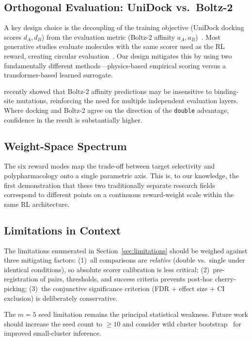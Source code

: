 
\subsection{Orthogonal Evaluation: UniDock vs.\ Boltz-2}

A key design choice is the decoupling of the training objective (UniDock
docking scores $d_A, d_B$) from the evaluation metric (Boltz-2 affinity
$a_A, a_B$)~\citep{passaro2025boltz2}.  Most generative studies evaluate
molecules with the same scorer used as the RL reward, creating circular
evaluation~\citep{abdelsayed2025polypharmacology}.
Our design mitigates this by using two fundamentally different
methods---physics-based empirical scoring versus a transformer-based
learned surrogate.


\citet{bret2026boltz2docking} recently showed that Boltz-2 affinity
predictions may be insensitive to binding-site mutations, reinforcing the
need for multiple independent evaluation layers.  Where docking and Boltz-2
agree on the direction of the \texttt{double} advantage, confidence in the
result is substantially higher.

\subsection{Weight-Space Spectrum}

The six reward modes map the trade-off between target selectivity and
polypharmacology onto a single parametric axis.  This is, to our knowledge,
the first demonstration that these two traditionally separate research
fields correspond to different points on a continuous reward-weight
scale within the same RL architecture.


\subsection{Limitations in Context}

The limitations enumerated in Section~\ref{sec:limitations} should be
weighed against three mitigating factors:
(1)~all comparisons are \emph{relative} (double vs.\ single under
identical conditions), so absolute scorer calibration is less critical;
(2)~pre-registration of pairs, thresholds, and success criteria
prevents post-hoc cherry-picking;
(3)~the conjunctive significance criterion (FDR $+$ effect size $+$
CI exclusion) is deliberately conservative.

The $m = 5$ seed limitation remains the principal statistical weakness.
Future work should increase the seed count to $\geq 10$ and consider
wild cluster bootstrap~\citep{cameron2008bootstrap} for improved
small-cluster inference.

